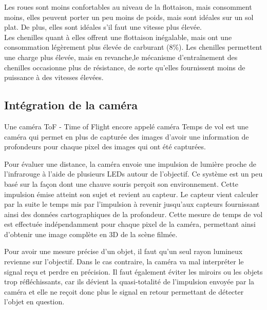 

Les roues sont moins confortables au niveau de la flottaison, mais consomment moins, elles peuvent porter un peu moins de poids, mais sont idéales sur un sol plat. De plus, elles sont idéales s’il faut une vitesse plus élevée.\\

Les chenilles quant à elles offrent une flottaison inégalable, mais ont une consommation légèrement plus élevée de carburant (8\%). Les chenilles permettent une charge plus élevée, mais en revanche,le mécanisme d’entraînement des chenilles occasionne plus de résistance, de sorte qu’elles fournissent moins de puissance à des vitesses élevées.

\subsection{Intégration de la caméra}
 
Une caméra ToF - Time of Flight encore appelé caméra Temps de vol  est une caméra qui permet en plus de capturée des images d'avoir une information de profondeurs pour chaque pixel des images qui ont été capturées. \\


Pour évaluer une distance, la caméra envoie une impulsion de lumière proche de l’infrarouge à l’aide de plusieurs LEDs autour de l’objectif. Ce système est un peu basé sur la façon dont une chauve souris perçoit son environnement. Cette impulsion émise atteint son sujet et revient au capteur. Le capteur vient calculer par la suite le temps mis par l’impulsion à revenir jusqu’aux capteurs fournissant ainsi des données cartographiques de la profondeur. Cette mesure de temps de vol est effectuée indépendamment pour chaque pixel de la caméra, permettant ainsi d’obtenir une image complète en 3D de la scène filmée.\\


Pour avoir une mesure précise d’un objet, il faut qu’un seul rayon lumineux revienne sur l’objectif. Dans le cas contraire, la caméra va mal interpréter le signal reçu et perdre en précision. 
Il faut également éviter les miroirs ou les objets trop réfléchissants, car ils dévient la quasi-totalité de l’impulsion envoyée par la caméra et elle ne reçoit donc plus le signal en retour permettant de détecter l’objet en question.\\


